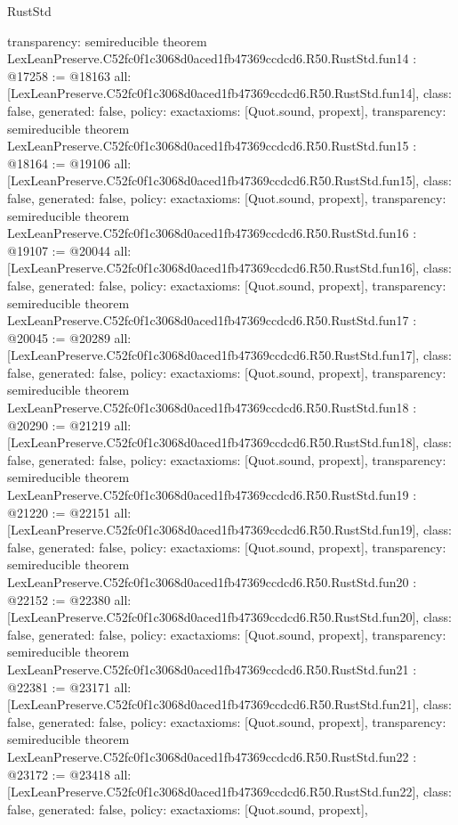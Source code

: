 \begin{lexlean}{RustStd}
\begin{coremodule}
{  transparency: semireducible
}
theorem LexLeanPreserve.C52fc0f1c3068d0aced1fb47369ccdcd6.R50.RustStd.fun14 : @17258 := @18163 {
  all: [LexLeanPreserve.C52fc0f1c3068d0aced1fb47369ccdcd6.R50.RustStd.fun14],
  class: false,
  generated: false,
  policy: exact{axioms: [Quot.sound, propext]},
  transparency: semireducible
}
theorem LexLeanPreserve.C52fc0f1c3068d0aced1fb47369ccdcd6.R50.RustStd.fun15 : @18164 := @19106 {
  all: [LexLeanPreserve.C52fc0f1c3068d0aced1fb47369ccdcd6.R50.RustStd.fun15],
  class: false,
  generated: false,
  policy: exact{axioms: [Quot.sound, propext]},
  transparency: semireducible
}
theorem LexLeanPreserve.C52fc0f1c3068d0aced1fb47369ccdcd6.R50.RustStd.fun16 : @19107 := @20044 {
  all: [LexLeanPreserve.C52fc0f1c3068d0aced1fb47369ccdcd6.R50.RustStd.fun16],
  class: false,
  generated: false,
  policy: exact{axioms: [Quot.sound, propext]},
  transparency: semireducible
}
theorem LexLeanPreserve.C52fc0f1c3068d0aced1fb47369ccdcd6.R50.RustStd.fun17 : @20045 := @20289 {
  all: [LexLeanPreserve.C52fc0f1c3068d0aced1fb47369ccdcd6.R50.RustStd.fun17],
  class: false,
  generated: false,
  policy: exact{axioms: [Quot.sound, propext]},
  transparency: semireducible
}
theorem LexLeanPreserve.C52fc0f1c3068d0aced1fb47369ccdcd6.R50.RustStd.fun18 : @20290 := @21219 {
  all: [LexLeanPreserve.C52fc0f1c3068d0aced1fb47369ccdcd6.R50.RustStd.fun18],
  class: false,
  generated: false,
  policy: exact{axioms: [Quot.sound, propext]},
  transparency: semireducible
}
theorem LexLeanPreserve.C52fc0f1c3068d0aced1fb47369ccdcd6.R50.RustStd.fun19 : @21220 := @22151 {
  all: [LexLeanPreserve.C52fc0f1c3068d0aced1fb47369ccdcd6.R50.RustStd.fun19],
  class: false,
  generated: false,
  policy: exact{axioms: [Quot.sound, propext]},
  transparency: semireducible
}
theorem LexLeanPreserve.C52fc0f1c3068d0aced1fb47369ccdcd6.R50.RustStd.fun20 : @22152 := @22380 {
  all: [LexLeanPreserve.C52fc0f1c3068d0aced1fb47369ccdcd6.R50.RustStd.fun20],
  class: false,
  generated: false,
  policy: exact{axioms: [Quot.sound, propext]},
  transparency: semireducible
}
theorem LexLeanPreserve.C52fc0f1c3068d0aced1fb47369ccdcd6.R50.RustStd.fun21 : @22381 := @23171 {
  all: [LexLeanPreserve.C52fc0f1c3068d0aced1fb47369ccdcd6.R50.RustStd.fun21],
  class: false,
  generated: false,
  policy: exact{axioms: [Quot.sound, propext]},
  transparency: semireducible
}
theorem LexLeanPreserve.C52fc0f1c3068d0aced1fb47369ccdcd6.R50.RustStd.fun22 : @23172 := @23418 {
  all: [LexLeanPreserve.C52fc0f1c3068d0aced1fb47369ccdcd6.R50.RustStd.fun22],
  class: false,
  generated: false,
  policy: exact{axioms: [Quot.sound, propext]},
}
\end{coremodule}
\end{lexlean}
